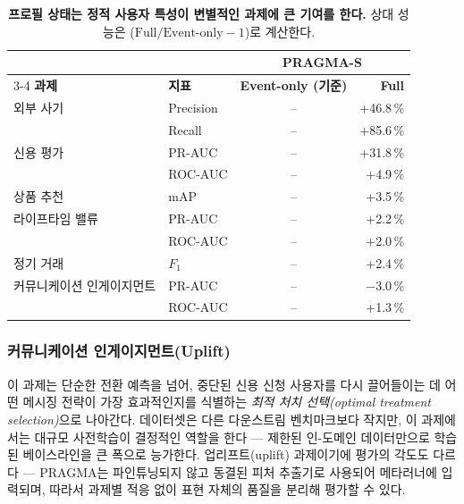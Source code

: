 \begin{table}[t]
\centering
\begin{tabular}{llcr}
& & \multicolumn{2}{c}{\textbf{PRAGMA-S}} \\
\cmidrule(lr){3-4}
\textbf{과제} & \textbf{지표} & \textbf{Event-only (기준)} & \textbf{Full} \\
\midrule
외부 사기           & Precision  & -- & +46.8\,\% \\
                         & Recall     & -- & +85.6\,\% \\
\addlinespace
신용 평가           & PR-AUC     & -- & +31.8\,\% \\
                         & ROC-AUC    & -- & +4.9\,\% \\
\addlinespace
상품 추천   & mAP        & -- & +3.5\,\% \\
\addlinespace
라이프타임 밸류           & PR-AUC     & -- & +2.2\,\% \\
                         & ROC-AUC    & -- & +2.0\,\% \\
\addlinespace
정기 거래   & $F_\text{1}$ & -- & +2.4\,\% \\
\addlinespace
커뮤니케이션 인게이지먼트 & PR-AUC     & -- & $-$3.0\,\% \\
                         & ROC-AUC    & -- & +1.3\,\% \\
\end{tabular}
\caption{
    \textbf{프로필 상태는 정적 사용자 특성이 변별적인 과제에 큰 기여를 한다.}
    상대 성능은 ($\text{Full} / \text{Event-only} - 1$)로 계산한다.
}
\label{tab:pragma_s_results}
\end{table}

\subsubsection{커뮤니케이션 인게이지먼트(Uplift)}
\label{sec:credit_engagement_communications_uplift}

이 과제는 단순한 전환 예측을 넘어, 중단된 신용 신청 사용자를 다시 끌어들이는 데 어떤 메시징 전략이 가장 효과적인지를 식별하는 \emph{최적 처치 선택(optimal treatment selection)}으로 나아간다.
데이터셋은 다른 다운스트림 벤치마크보다 작지만, 이 과제에서는 대규모 사전학습이 결정적인 역할을 한다 — 제한된 인-도메인 데이터만으로 학습된 베이스라인을 큰 폭으로 능가한다.
업리프트(uplift) 과제이기에 평가의 각도도 다르다 — PRAGMA는 파인튜닝되지 않고 동결된 피처 추출기로 사용되어 메타러너에 입력되며, 따라서 과제별 적응 없이 표현 자체의 품질을 분리해 평가할 수 있다.

